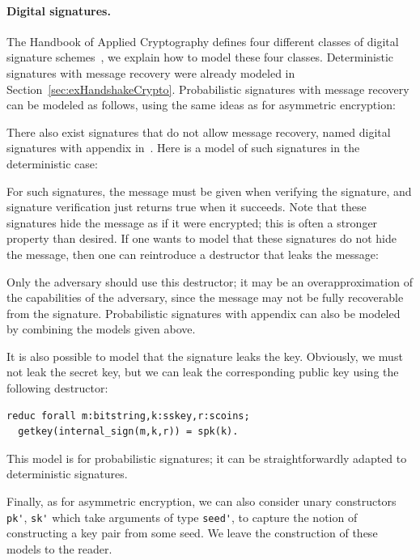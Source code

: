 \documentclass{book}
\begin{document}
\paragraph{Digital signatures.} The Handbook of Applied Cryptography defines four different classes of digital signature schemes~\cite[Figure 11.1]{HAC}, we explain how to model these four classes. Deterministic signatures with message recovery were already modeled in Section~\ref{sec:exHandshakeCrypto}. Probabilistic signatures with message recovery can be modeled as follows, using the same ideas as for asymmetric encryption:

There also exist signatures that do not allow message recovery, named digital signatures with appendix in~\cite{HAC}. Here is a model of such signatures in the deterministic case:

For such signatures, the message must be given when verifying the signature, and signature verification just returns true when it succeeds. Note that these signatures hide the message as if it were encrypted; this is often a stronger property than desired. If one wants to model that these signatures do not hide the message, then one can reintroduce a destructor that leaks the message:

Only the adversary should use this destructor; it may be an overapproximation of the capabilities of the adversary, since the message may not be fully recoverable from the signature.
Probabilistic signatures with appendix can also be modeled by combining the models given above.

It is also possible to model that the signature leaks the key. Obviously, we must not leak the secret key, but we can leak the corresponding public key using the following destructor:
\begin{lstlisting}[numbers=none]
reduc forall m:bitstring,k:sskey,r:scoins;
  getkey(internal_sign(m,k,r)) = spk(k).
\end{lstlisting}
This model is for probabilistic signatures; it can be straightforwardly adapted to deterministic signatures.

Finally, as for asymmetric encryption, we can also consider unary constructors \lstinline{pk'}, \lstinline{sk'} which take arguments of type \lstinline{seed'}, to capture the notion of constructing a key pair from some seed. We leave the construction of these models to the reader.
\end{document}

